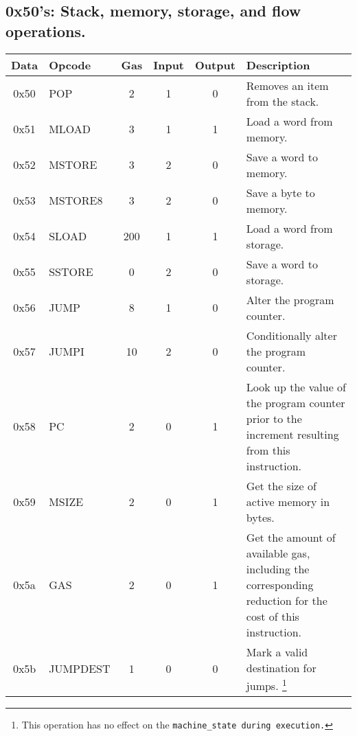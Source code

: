 \documentclass[10pt,a4paper,leqno,bibliography=totoc]{scrartcl}
\newenvironment{alphafootnotes}
{\par\edef\savedfootnotenumber{\number\value{footnote}}
\renewcommand{\thefootnote}{\alph{footnote}}
\setcounter{footnote}{0}}
{\par\setcounter{footnote}{\savedfootnotenumber}}
\begin{document}
\begin{alphafootnotes}
		\subsection{0x50's: Stack, memory, storage, and flow operations.}
			\begin{longtable}{|cP{2.8cm}cccp{6cm}|}
			\hline
			\textbf{Data} & \textbf{Opcode} & \textbf{Gas}  & \textbf{Input}  & \textbf{Output} & \textbf{Description} \\
			\hline
			0x50 & POP & 2 & 1 & 0 & Removes an item from the stack. \\
			0x51 & MLOAD & 3 & 1 & 1 & Load a word from memory. \\
			0x52 & MSTORE & 3 & 2 & 0 & Save a word to memory. \\
			0x53 & MSTORE8 & 3 & 2 & 0 & Save a byte to memory. \\
			0x54 & SLOAD & 200 & 1 & 1 & Load a word from storage. \\
			0x55 & SSTORE & 0 & 2 & 0 & Save a word to storage.\\
			0x56 & JUMP & 8 & 1 & 0 & Alter the program counter. \\
			0x57 & JUMPI & 10 & 2 & 0 & Conditionally alter the program counter. \\
			0x58 & PC & 2 & 0 & 1 & Look up the value of the program counter prior to the increment resulting from this instruction. \\
			0x59 & MSIZE & 2 & 0 & 1 & Get the size of active memory in bytes. \\
			0x5a & GAS & 2 & 0 & 1 & Get the amount of available gas, including the corresponding reduction for the cost of this instruction. \\
			0x5b & JUMPDEST & 1 & 0 & 0 & Mark a valid destination for jumps. \footnote{This operation has no effect on the \texttt{machine\_state during execution.}} \\
			\hline
			\end{longtable}


\end{alphafootnotes}
\end{document}
